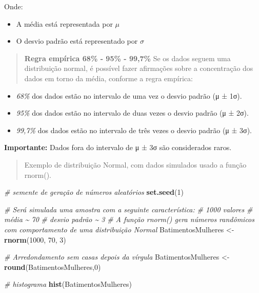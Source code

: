 \documentclass[
]{book}
\newenvironment{Shaded}{\begin{snugshade}}{\end{snugshade}}
\newcommand{\CommentTok}[1]{\textcolor[rgb]{0.56,0.35,0.01}{\textit{#1}}}
\newcommand{\DecValTok}[1]{\textcolor[rgb]{0.00,0.00,0.81}{#1}}
\newcommand{\FunctionTok}[1]{\textcolor[rgb]{0.13,0.29,0.53}{\textbf{#1}}}
\newcommand{\NormalTok}[1]{#1}
\newcommand{\OtherTok}[1]{\textcolor[rgb]{0.56,0.35,0.01}{#1}}
\providecommand{\tightlist}{%
  \setlength{\itemsep}{0pt}\setlength{\parskip}{0pt}}
\begin{document}
Onde:

\begin{itemize}
\tightlist
\item
  A média está representada por \(\mu\)
\item
  O desvio padrão está representado por \(\sigma\)
\end{itemize}

\begin{quote}
\textbf{Regra empírica 68\% - 95\% - 99,7\%}
Se os dados seguem uma distribuição normal, é possível fazer afirmações sobre a concentração dos dados em torno da média, conforme a regra empírica:
\end{quote}

\begin{itemize}
\tightlist
\item
  \emph{68\%} dos dados estão no intervalo de uma vez o desvio padrão (μ ± 1σ).
\item
  \emph{95\%} dos dados estão no intervalo de duas vezes o desvio padrão (μ ± 2σ).
\item
  \emph{99,7\%} dos dados estão no intervalo de três vezes o desvio padrão (μ ± 3σ).
\end{itemize}

\textbf{Importante:} Dados fora do intervalo de μ ± 3σ são considerados raros.

\begin{quote}
Exemplo de distribuição Normal, com dados simulados usado a função rnorm().
\end{quote}

\begin{Shaded}
\begin{Highlighting}[]
\CommentTok{\# semente de geração de números aleatórios }
\FunctionTok{set.seed}\NormalTok{(}\DecValTok{1}\NormalTok{)}

\CommentTok{\# Será simulada uma amostra com a seguinte característica:}
\CommentTok{\# 1000 valores}
\CommentTok{\# média \textasciitilde{} 70}
\CommentTok{\# desvio padrão \textasciitilde{} 3}
\CommentTok{\# A função rnorm() gera números randômicos com comportamento de uma distribuição Normal }
\NormalTok{BatimentosMulheres }\OtherTok{\textless{}{-}} \FunctionTok{rnorm}\NormalTok{(}\DecValTok{1000}\NormalTok{, }\DecValTok{70}\NormalTok{, }\DecValTok{3}\NormalTok{)}

\CommentTok{\# Arredondamento sem casas depois da vírgula}
\NormalTok{BatimentosMulheres }\OtherTok{\textless{}{-}} \FunctionTok{round}\NormalTok{(BatimentosMulheres,}\DecValTok{0}\NormalTok{)}

\CommentTok{\# histograma}
\FunctionTok{hist}\NormalTok{(BatimentosMulheres)}
\end{Highlighting}
\end{Shaded}
\end{document}
